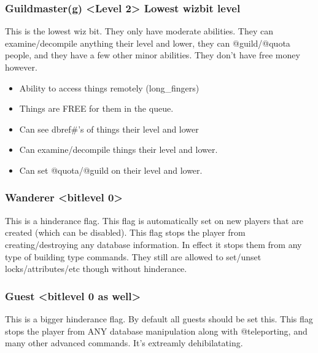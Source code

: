 \documentclass[letterpaper,10pt,english]{sphinxmanual}
\begin{document}
\subsubsection{Guildmaster(g) \textless{}Level 2\textgreater{} \sphinxhyphen{} Lowest wizbit level}
\label{\detokenize{toggles:guildmaster-g-level-2-lowest-wizbit-level}}
\sphinxAtStartPar
This is the lowest wiz bit.  They only have moderate abilities.
They can examine/decompile anything their level and lower, they can
@guild/@quota people, and they have a few other minor abilities.
They don’t have free money however.
\begin{itemize}
\item {} 
\sphinxAtStartPar
Ability to access things remotely (long\_fingers)

\item {} 
\sphinxAtStartPar
Things are FREE for them in the queue.

\item {} 
\sphinxAtStartPar
Can see dbref\#’s of things their level and lower

\item {} 
\sphinxAtStartPar
Can examine/decompile things their level and lower.

\item {} 
\sphinxAtStartPar
Can set @quota/@guild on their level and lower.

\end{itemize}


\subsubsection{Wanderer \textless{}bitlevel 0\textgreater{}}
\label{\detokenize{toggles:wanderer-bitlevel-0}}
\sphinxAtStartPar
This is a hinderance flag.  This flag is automatically set on new
players that are created (which can be disabled).  This flag stops
the player from creating/destroying any database information.   In
effect it stops them from any type of building type commands.  They
still are allowed to set/unset locks/attributes/etc though without
hinderance.


\subsubsection{Guest \textless{}bitlevel 0 as well\textgreater{}}
\label{\detokenize{toggles:guest-bitlevel-0-as-well}}
\sphinxAtStartPar
This is a bigger hinderance flag.  By default all guests should be
set this.  This flag stops the player from ANY database manipulation
along with @teleporting, and many other advanced commands.  It’s
extreamly dehibilatating.
\end{document}

